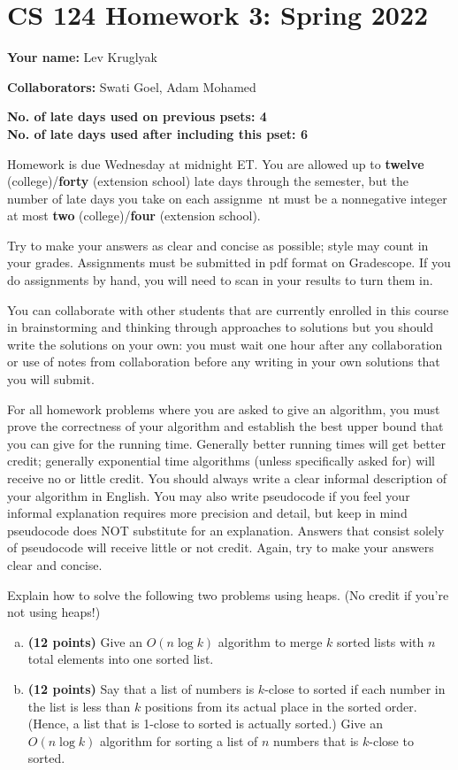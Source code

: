 \documentclass[11pt,letterpaper]{article}
\begin{document}
\section*{CS 124 Homework 3: Spring 2022}

\textbf{Your name:} Lev Kruglyak

\textbf{Collaborators:} Swati Goel, Adam Mohamed

\textbf{No. of late days used on previous psets: 4}\\
\textbf{No. of late days used after including this pset: 6}

Homework is due Wednesday at midnight ET. You are allowed up to {\bf twelve} (college)/{\bf forty} (extension school) late days through the semester, but the number of late days you take on each assignme\
nt must be a nonnegative integer at most {\bf two} (college)/{\bf four} (extension school).

Try to make your answers as clear and concise as possible;
style may count in your grades. Assignments must be submitted in pdf format on Gradescope. If you do assignments by hand, you will need to scan in your results to turn them in.

You can collaborate with other students that are currently enrolled in this
course in brainstorming and thinking through approaches to solutions but you should write
the solutions on your own: you must wait one hour after any collaboration or use of notes
from collaboration before any writing in your own solutions that you will submit. 

For all homework problems where you are asked to give an algorithm, you must prove the correctness
of your algorithm and establish the best upper bound that you can give for the running time. Generally
better running times will get better credit; generally exponential time algorithms (unless specifically asked
for) will receive no or little credit. You should always write a clear informal description of your algorithm
in English. You may also write pseudocode if you feel your informal explanation requires more precision
and detail, but keep in mind pseudocode does NOT substitute for an explanation. Answers that consist
solely of pseudocode will receive little or not credit. Again, try to make your answers clear and concise.

\pagebreak
\begin{problem}
    Explain how to solve the following two problems using heaps.  (No credit if you're not using heaps!)  
    \begin{enumerate}[(a)]
        \item {\bf (12 points)} Give an $O(n \log k)$ algorithm to merge $k$ sorted lists with $n$ total elements into one sorted list.
        \item {\bf (12 points)} Say that a list of numbers is $k$-close to sorted if each number in the list is less than $k$ positions from its actual place in the sorted order.  (Hence, a list that is 1-close to sorted is actually sorted.)  Give an $O(n \log k)$ algorithm for sorting a list of $n$ numbers that is $k$-close to sorted.
    \end{enumerate}
\end{problem}
\end{document}
